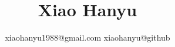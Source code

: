 
\usepackage{fontspec}

\usepackage[margin=1in]{geometry}
\setlength\parindent{0in}

\usepackage{multicol}
\usepackage{enumitem}

\usepackage{xunicode}
\usepackage{xltxtra}
\setmainfont[Ligatures={Common}, Numbers={OldStyle}]{Hoefler Text}
\setmonofont[Scale=0.8]{Droid Sans Mono}
\setsansfont[Scale=0.8]{Monaco}

\usepackage{sectsty}
\usepackage[normalem]{ulem}
\sectionfont{\sffamily\mdseries\large\underline} %
\setcounter{secnumdepth}{-1} %
\subsectionfont{\rmfamily\mdseries\scshape\normalsize}
\subsubsectionfont{\rmfamily\bfseries\upshape\normalsize}

\usepackage{titling}

\setlength{\droptitle}{-90pt} %
\title{ Xiao Hanyu } %
\author{ xiaohanyu1988@gmail.com \textbar{} xiaohanyu@github } %
\date{} %

